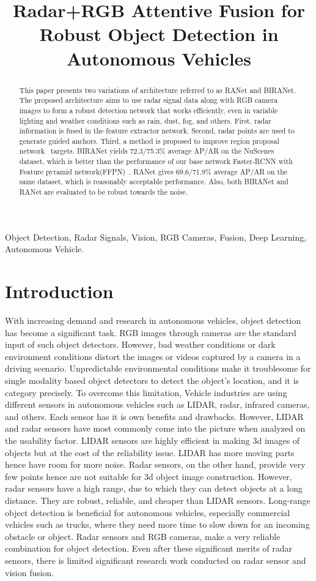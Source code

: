 \documentclass{article}
\title{Radar+RGB Attentive Fusion for Robust Object Detection in Autonomous Vehicles}
\begin{document}
\maketitle
\begin{abstract}
This paper presents two variations of architecture referred to as RANet and BIRANet. The proposed architecture aims to use radar signal data along with RGB camera images to form a robust detection network that works efficiently, even in variable lighting and weather conditions such as rain, dust, fog, and others. First, radar information is fused in the feature extractor network. Second, radar points are used to generate guided anchors. Third, a method is proposed to improve region proposal network~\cite{ren2015faster} targets. BIRANet yields 72.3/75.3\% average AP/AR on the NuScenes~\cite{caesar2019nuscenes} dataset, which is better than the performance of our base network Faster-RCNN with Feature pyramid network(FFPN)~\cite{lin2017feature}. RANet gives 69.6/71.9\% average AP/AR on the same dataset, which is reasonably acceptable performance. Also, both BIRANet and RANet are evaluated to be robust towards the noise.
\end{abstract}
\begin{keywords}
Object Detection, Radar Signals, Vision, RGB Cameras, Fusion, Deep Learning, Autonomous Vehicle.
\end{keywords}
\section{Introduction}
\label{sec:intro}

With increasing demand and research in autonomous vehicles, object detection has become a significant task. RGB images through cameras are the standard input of such object detectors. However, bad weather conditions or dark environment conditions distort the images or videos captured by a camera in a driving scenario. Unpredictable environmental conditions make it troublesome for single modality based object detectors to detect the object's location, and it is category precisely. To overcome this limitation, Vehicle industries are using different sensors in autonomous vehicles such as LIDAR, radar, infrared cameras, and others. Each sensor has it is own benefits and drawbacks. However, LIDAR and radar sensors have most commonly come into the picture when analyzed on the usability factor. LIDAR sensors are highly efficient in making 3d images of objects but at the cost of the reliability issue. LIDAR has more moving parts hence have room for more noise. Radar sensors, on the other hand, provide very few points hence are not suitable for 3d object image construction. However, radar sensors have a high range, due to which they can detect objects at a long distance. They are robust, reliable, and cheaper than LIDAR sensors. Long-range object detection is beneficial for autonomous vehicles, especially commercial vehicles such as trucks, where they need more time to slow down for an incoming obstacle or object. Radar sensors and RGB cameras, make a very reliable combination for object detection. Even after these significant merits of radar sensors, there is limited significant research work conducted on radar sensor and vision fusion.
\end{document}
